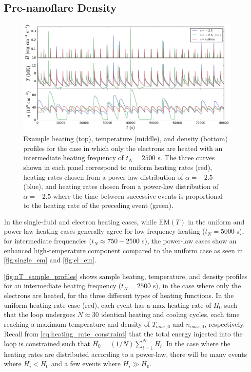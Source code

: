 \documentclass[apj]{emulateapj}
\begin{document}
	\subsection{Pre-nanoflare Density}
	\label{subsec:pre_nanoflare_density}
	\begin{figure}
		\centering
		\includegraphics[width=2\columnwidth]{figures/nT_sample_curves_tn2500_electron.pdf}
		\caption{Example heating (top), temperature (middle), and density (bottom) profiles for the case in which only the electrons are heated with an intermediate heating frequency of $t_N=2500$ s. The three curves shown in each panel correspond to uniform heating rates (red), heating rates chosen from a power-law distribution of $\alpha=-2.5$ (blue), and heating rates chosen from a power-law distribution of $\alpha=-2.5$ where the time between successive events is proportional to the heating rate of the preceding event (green).}
		\label{fig:nT_sample_profiles}
	\end{figure}
	\par In the single-fluid and electron heating cases, while $\mathrm{EM}(T)$ in the uniform and power-law heating cases generally agree for low-frequency heating ($t_N=5000$ s), for intermediate frequencies ($t_N\approx750-2500$ s), the power-law cases show an enhanced high-temperature component compared to the uniform case as seen in \autoref{fig:single_em} and \autoref{fig:el_em}.
	\par\autoref{fig:nT_sample_profiles} shows sample heating, temperature, and density profiles for an intermediate heating frequency ($t_N=2500$ s), in the case where only the electrons are heated, for the three different types of heating functions. In the uniform heating rate case (red), each event has a max heating rate of $H_0$ such that the loop undergoes $N\approx30$ identical heating and cooling cycles, each time reaching a maximum temperature and density of $T_{max,0}$ and $n_{max,0}$, respectively. Recall from \autoref{eq:heating_rate_constraint} that the total energy injected into the loop is constrained such that $H_0=(1/N)\sum_{i=1}^NH_i$. In the case where the heating rates are distributed according to a power-law, there will be many events where $H_i<H_0$ and a few events where $H_i\gg H_0$. 
\end{document}
